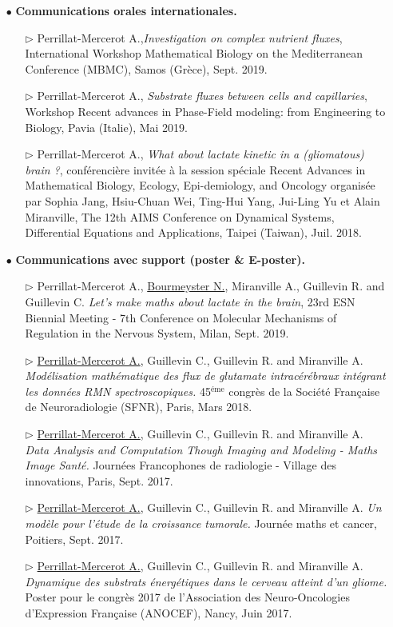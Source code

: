 \documentclass[a4paper, 12pt, twoside, openright]{article}
\begin{document}
\begin{itemize}
\item[\color{MagSombre}$\bullet$] \textbf{\color{MagSombre}Communications orales internationales.}
\begin{itemize}
\item[$\triangleright$] Perrillat-Mercerot A.,\textit{Investigation on complex nutrient 
fluxes}, International Workshop Mathematical Biology on the Mediterranean Conference (MBMC), Samos (Grèce), Sept. 2019.
\item[$\triangleright$] Perrillat-Mercerot A., \textit{Substrate fluxes between cells and capillaries}, Workshop Recent advances in Phase-Field modeling: from Engineering to Biology, Pavia (Italie), Mai 2019.
\item[$\triangleright$]  Perrillat-Mercerot A., \textit{What about lactate kinetic in a (gliomatous) brain ?}, conférencière invitée à la session spéciale Recent Advances in Mathematical Biology, Ecology, Epi-demiology, and Oncology organisée par Sophia Jang, Hsiu-Chuan Wei, Ting-Hui Yang, Jui-Ling Yu et Alain Miranville, The 12th AIMS Conference on Dynamical Systems, Differential Equations and Applications, Taipei (Taiwan), Juil. 2018.
\end{itemize}
\item[\color{MagSombre}$\bullet$] \textbf{\color{MagSombre}Communications avec support (poster \& E-poster).} \begin{itemize}
\item[$\triangleright$] Perrillat-Mercerot A., \uline{Bourmeyster N.}, Miranville A., Guillevin R. and  Guillevin C. \textit{Let's make maths about lactate in the brain}, 23rd ESN Biennial Meeting - 7th Conference on Molecular Mechanisms of Regulation in the Nervous System, Milan, Sept. 2019.
\item[$\triangleright$] \uline{Perrillat-Mercerot A.}, Guillevin C., Guillevin R. and Miranville A. \textit{Modélisation mathématique des flux de glutamate intracérébraux
intégrant les données RMN spectroscopiques.} 45$^\text{éme}$ congrès de la Société Française de Neuroradiologie (SFNR), Paris, Mars 2018.
\item[$\triangleright$]   \uline{Perrillat-Mercerot A.}, Guillevin C., Guillevin R. and Miranville A. \textit{Data Analysis and Computation Though Imaging and Modeling - Maths Image Santé.} Journées Francophones de radiologie - Village des innovations, Paris, Sept. 2017.
\item[$\triangleright$] \uline{Perrillat-Mercerot A.}, Guillevin C., Guillevin R. and Miranville A. \textit{Un modèle pour l'étude de la croissance tumorale.} Journée maths et cancer, Poitiers, Sept. 2017.
\item[$\triangleright$] \uline{Perrillat-Mercerot A.}, Guillevin C., Guillevin R. and Miranville A.  \textit{Dynamique des substrats énergétiques dans le cerveau atteint d'un gliome.} Poster pour le congrès 2017 de l'Association des Neuro-Oncologies d'Expression Française (ANOCEF), Nancy, Juin 2017.
\end{itemize}
\end{itemize}
\end{document}
